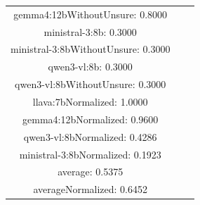 \documentclass[a4paper]{article}
\begin{document}
\begin{tabular}{ccc}
gemma4:12bWithoutUnsure: 0.8000 \\ ministral-3:8b: 0.3000 \\ ministral-3:8bWithoutUnsure: 0.3000 \\ qwen3-vl:8b: 0.3000 \\ qwen3-vl:8bWithoutUnsure: 0.3000 \\ llava:7bNormalized: 1.0000 \\ gemma4:12bNormalized: 0.9600 \\ qwen3-vl:8bNormalized: 0.4286 \\ ministral-3:8bNormalized: 0.1923 \\ average: 0.5375 \\ averageNormalized: 0.6452 \end{minipage}\\
\end{tabular}

\vspace{5mm}
\end{document}
